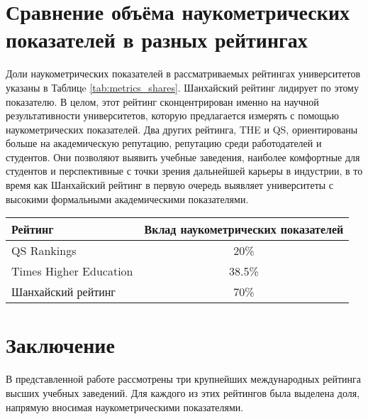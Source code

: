 \section{Сравнение объёма наукометрических показателей в разных рейтингах}

Доли наукометрических показателей в рассматриваемых рейтингах университетов
указаны в Таблицe \ref{tab:metrics_shares}. Шанхайский рейтинг лидирует по этому показателю.
В целом, этот рейтинг сконцентрирован именно на научной результативности
университетов, которую предлагается измерять с помощью наукометрических показателей.
Два других рейтинга, THE и QS, ориентированы больше на академическую репутацию,
репутацию среди работодателей и студентов. Они позволяют выявить учебные заведения,
наиболее комфортные для студентов и перспективные с точки зрения дальнейшей карьеры в индустрии,
в то время как Шанхайский рейтинг в первую очередь выявляет университеты с
высокими формальными академическими показателями.

\begin{table*}[h!]
\caption{}
\label{tab:metrics_shares}
  \centering
  \begin{tabular}{|l|c|}
    \hline
    Рейтинг & Вклад наукометрических показателей \\ \hline
    QS Rankings & 20\% \\
    Times Higher Education & 38.5\% \\
    Шанхайский рейтинг & 70\% \\
    \hline
  \end{tabular}
\end{table*}

\section{Заключение}

В представленной работе рассмотрены три крупнейших международных рейтинга высших
учебных заведений. Для каждого из этих рейтингов была выделена доля, напрямую вносимая
наукометрическими показателями.
